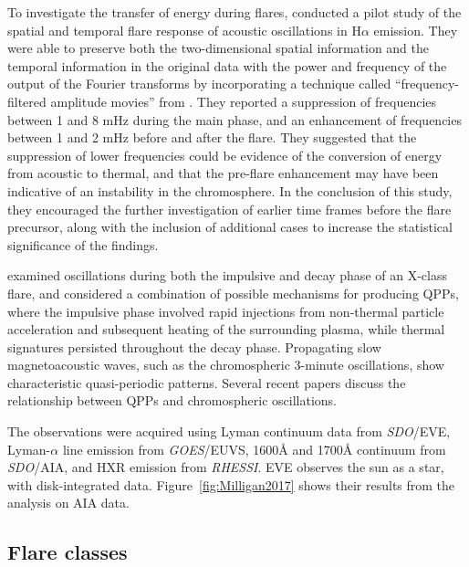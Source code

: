 To investigate the transfer of energy during flares, \cite{Monsue2016}
conducted a pilot study of the spatial and temporal flare response of acoustic
oscillations in H$\alpha$ emission.
They were able to preserve both the two-dimensional spatial information
and the temporal information in the original data
with the power and frequency of the output of the Fourier transforms
by incorporating a technique called ``frequency-filtered amplitude movies''
from \cite{Jackiewicz2013}.
They reported a suppression of frequencies
between 1 and 8 mHz during the main phase, and an enhancement of frequencies
between 1 and 2 mHz before and after the flare. They suggested that the
suppression of lower frequencies could be evidence of the conversion of energy
from acoustic to thermal, and that the pre-flare enhancement may have been
indicative of an instability in the chromosphere.
In the conclusion of this study, they encouraged
the further investigation of
earlier time frames before the flare precursor, along with the
inclusion of additional cases to increase the statistical significance of the
findings.

\cite{Hayes2016} examined oscillations during
both the impulsive and decay phase of an X-class flare, and considered
a combination of possible mechanisms for producing QPPs, where the
impulsive phase involved rapid injections from non-thermal particle
acceleration and subsequent heating of the surrounding plasma, while
thermal signatures persisted throughout the decay phase.
Propagating slow magnetoacoustic waves, such as the chromospheric
3-minute oscillations, show characteristic quasi-periodic patterns.
Several recent papers discuss the relationship between QPPs and
chromospheric oscillations.



The observations were acquired using
Lyman continuum data from \textit{SDO}/EVE,
Lyman-$\alpha$ line emission from \textit{GOES}/EUVS,
1600\AA{} and 1700\AA{} continuum from \textit{SDO}/AIA, and
HXR emission from \textit{RHESSI}.
EVE observes the sun as a star, with disk-integrated data.
Figure~\ref{fig:Milligan2017} shows their
results from the analysis on AIA data.


\subsection{Flare classes}


